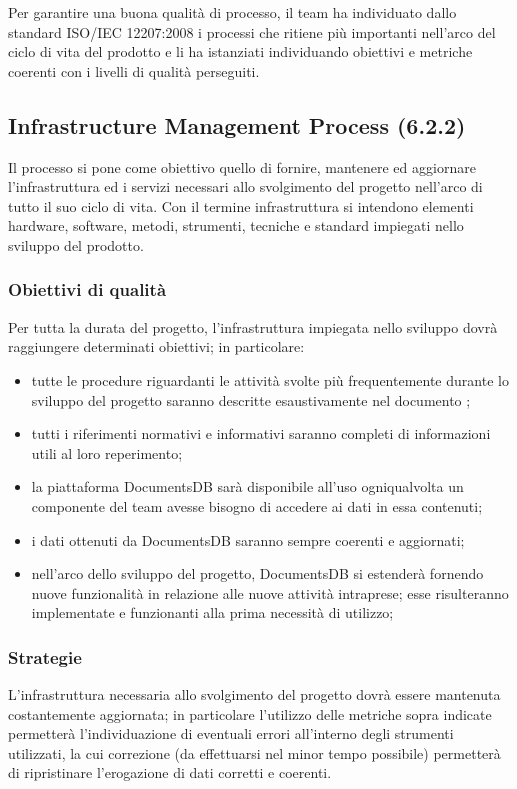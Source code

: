 Per garantire una buona qualità di processo, il team ha individuato dallo standard ISO/IEC 12207:2008 i processi che ritiene più importanti nell'arco del ciclo di vita del prodotto e li ha istanziati individuando obiettivi e metriche coerenti con i livelli di qualità perseguiti.
\subsection{Infrastructure Management Process (6.2.2)}
Il processo si pone come obiettivo quello di fornire, mantenere ed aggiornare l'infrastruttura ed i servizi necessari allo svolgimento del progetto nell'arco di tutto il suo ciclo di vita. Con il termine infrastruttura si intendono elementi hardware, software, metodi, strumenti, tecniche e standard impiegati nello sviluppo del prodotto.
\subsubsection{Obiettivi di qualità}
Per tutta la durata del progetto, l'infrastruttura impiegata nello sviluppo dovrà raggiungere determinati obiettivi; in particolare:
\begin{itemize}
\item tutte le procedure riguardanti le attività svolte più frequentemente durante lo sviluppo del progetto saranno descritte esaustivamente nel documento \textit{\NdP};
\item tutti i riferimenti normativi e informativi saranno completi di informazioni utili al loro reperimento;
\item la piattaforma DocumentsDB sarà disponibile all'uso ogniqualvolta un componente del team avesse bisogno di accedere ai dati in essa contenuti;
\item i dati ottenuti da DocumentsDB saranno sempre coerenti e aggiornati;
\item nell'arco dello sviluppo del progetto, DocumentsDB si estenderà fornendo nuove funzionalità in relazione alle nuove attività intraprese; esse risulteranno implementate e funzionanti alla prima necessità di utilizzo;
\end{itemize}
\subsubsection{Strategie}
L'infrastruttura necessaria allo svolgimento del progetto dovrà essere mantenuta costantemente aggiornata; in particolare l'utilizzo delle metriche sopra indicate permetterà l'individuazione di eventuali errori all'interno degli strumenti utilizzati, la cui correzione (da effettuarsi nel minor tempo possibile) permetterà di ripristinare l'erogazione di dati corretti e coerenti.
